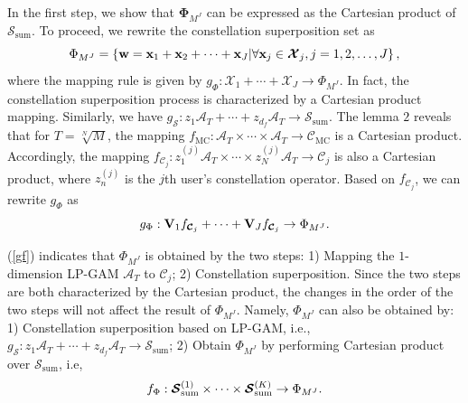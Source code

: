 \documentclass[journal]{IEEEtran}
\begin{document}
 In the first step, we show that $\boldsymbol {\Phi}_{M^J}$ can be expressed as the Cartesian product  of $\boldsymbol{\mathcal S}_{\text{sum}}$. To proceed,  we  rewrite the constellation superposition set as 
 \begin{equation}
 \small
    \Phi_{M^J}  =  \left\{ \mathbf w = \mathbf x_1 + \mathbf x_2 + \cdots  +\mathbf x_J \vert \forall \mathbf x_j\in  \boldsymbol {\mathcal{X}}_{j}, j =1,2,\ldots,J\right\}, 
 \end{equation}
 where the mapping rule is given by $ g_{\Phi}: \boldsymbol{\mathcal X}_{1}+  \cdots +  \boldsymbol{\mathcal X}_{J} \rightarrow \Phi_{M^J} $.   In fact,  the constellation  superposition process is characterized by a Cartesian product mapping. Similarly, we have  $ g_{\boldsymbol{\mathcal S}}: z_1  \mathcal A _{{T}} + \cdots + z_{d_f} \mathcal A _{{T}} \rightarrow \boldsymbol{\mathcal S}_{\text{sum}}$.  
 The lemma $2$ reveals that for $  {T = \sqrt[N]{M}}$, the mapping  $ f_{\text{MC}}: \mathcal A _{{T}} \times \cdots \times \mathcal A _{{T}} \rightarrow \boldsymbol {\mathcal C}_{\text{MC}}$ is  a Cartesian product. Accordingly,  the mapping $ f_{\boldsymbol{\mathcal{C}}_j }:  z_1^{(j)}  \mathcal A _{{T}} \times \cdots \times z_{N}^{(j)} \mathcal A _{{T}}  \rightarrow \boldsymbol {\mathcal C}_{j}$ is also a Cartesian product, where $z_{n}^{(j)}$ is the    $j$th user's constellation operator. Based on $f_{\mathcal{C}_j }$, we can rewrite $g_{\Phi}$ as
 \begin{equation}
 \small\label{gf}
    g_{\Phi}: \mathbf{V}_{1}f_{\boldsymbol{\mathcal{C}}_j }  +  \cdots +   \mathbf{V}_{J}f_{\boldsymbol{\mathcal{C}}_j } \rightarrow \Phi_{M^J}.   
 \end{equation}
 
  (\ref{gf}) indicates that  $\Phi_{M^J}$  is obtained by the two  steps:  1) Mapping   the $1$-dimension LP-GAM $\mathcal A _{{T}}$ to  $ \boldsymbol {\mathcal C}_{j}$; 2) Constellation superposition. Since the two steps are both characterized by the Cartesian product, the changes in the order of the two steps will not affect  the result of $ \Phi_{M^J}$. Namely,    $ \Phi_{M^J}$ can also be obtained by: 1)  Constellation superposition   based on LP-GAM, i.e., $ g_{\boldsymbol{\mathcal S}}: z_1  \mathcal A _{{T}} + \cdots + z_{d_f} \mathcal A _{{T}} \rightarrow \boldsymbol{\mathcal S}_{\text{sum}}$; 2) Obtain  $ \Phi_{M^J}$ by performing  Cartesian product over $\boldsymbol{\mathcal S}_{\text{sum}}$, i.e,  
  \begin{equation}
 \small\label{gf2}
    f_{\Phi}: \boldsymbol{\mathcal S}_{\text{sum}}^{(1)} \times  \cdots \times \boldsymbol{\mathcal S}_{\text{sum}}^{(K)}  \rightarrow \Phi_{M^J}.   
 \end{equation}
 
\end{document}
